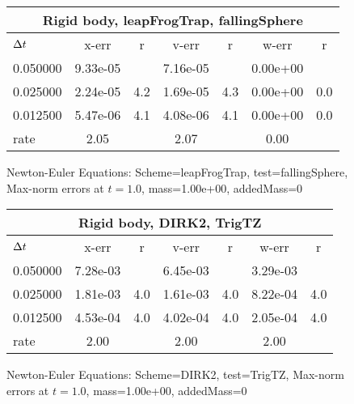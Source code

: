 \begin{figure}[hbt]\tableFont %
\begin{center}
\begin{tabular}{|l|c|c|c|c|c|c|} \hline 
\multicolumn{7}{|c|}{Rigid body, leapFrogTrap, fallingSphere}     \\ \hline
${\Delta t}$    &  x-err   &   r   &  v-err   &   r   &  w-err   &   r   \\ \hline
0.050000 & 9.33e-05 &       & 7.16e-05 &       & 0.00e+00 &         \\ \hline
0.025000 & 2.24e-05 &  4.2  & 1.69e-05 &  4.3  & 0.00e+00 &  0.0    \\ \hline
0.012500 & 5.47e-06 &  4.1  & 4.08e-06 &  4.1  & 0.00e+00 &  0.0    \\ \hline
 rate    &  2.05   &       &  2.07   &       &  0.00   &          \\ \hline
\end{tabular}
\caption{Newton-Euler Equations: Scheme=leapFrogTrap, test=fallingSphere, Max-norm errors at $t= 1.0$, mass=1.00e+00, addedMass=0 }
\label{tab:TestfallingSphere_SchemeleapFrogTrap}
\end{center}
\end{figure} 
\begin{figure}[hbt]\tableFont %
\begin{center}
\begin{tabular}{|l|c|c|c|c|c|c|} \hline 
\multicolumn{7}{|c|}{Rigid body, DIRK2, TrigTZ}     \\ \hline
${\Delta t}$    &  x-err   &   r   &  v-err   &   r   &  w-err   &   r   \\ \hline
0.050000 & 7.28e-03 &       & 6.45e-03 &       & 3.29e-03 &         \\ \hline
0.025000 & 1.81e-03 &  4.0  & 1.61e-03 &  4.0  & 8.22e-04 &  4.0    \\ \hline
0.012500 & 4.53e-04 &  4.0  & 4.02e-04 &  4.0  & 2.05e-04 &  4.0    \\ \hline
 rate    &  2.00   &       &  2.00   &       &  2.00   &          \\ \hline
\end{tabular}
\caption{Newton-Euler Equations: Scheme=DIRK2, test=TrigTZ, Max-norm errors at $t= 1.0$, mass=1.00e+00, addedMass=0 }
\label{tab:TestTrigTZ_SchemeDIRK2}
\end{center}
\end{figure} 
